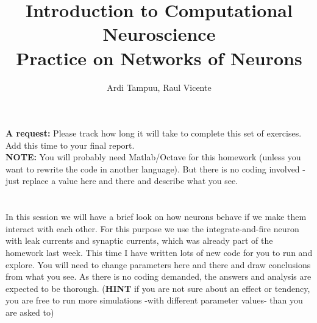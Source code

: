 \documentclass[a4paper,11pt]{article}
\author{\large{Ardi Tampuu, Raul Vicente}}
\title{\huge{Introduction to Computational Neuroscience}\\\LARGE{Practice on Networks of Neurons}}
\begin{document}
\maketitle

\textbf{A request:} Please track how long it will take to complete this set of exercises. Add this time to your final report.
\ \\

\textbf{NOTE:} You will probably need Matlab/Octave for this homework (unless you want to rewrite the code in another language). But there is no coding involved - just replace a value here and there and describe what you see.\\
\ \\
\ \\
%
%
In this session we will have a brief look on how neurons behave if we make them interact with each other. For this purpose we use the integrate-and-fire neuron with leak currents and synaptic currents, which was already part of the homework last week. This time I have written lots of new code for you to run and explore. You will need to change parameters here and there and draw conclusions from what you see. As there is no coding demanded, the answers and analysis are expected to be thorough. (\textbf{HINT} if you are not sure about an effect or tendency, you are free to run more simulations -with different parameter values- than you are asked to)

\ \\
\end{document}
